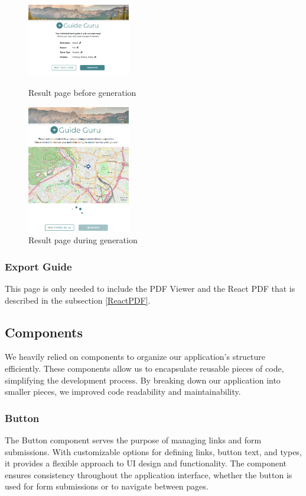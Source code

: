 \documentclass[english,notitlepage,smartquotes]{hgbreport}
\begin{document}
\begin{figure}[H]
	\centering
	\includegraphics[width=0.4\textwidth]{ResultPage.png}
	\caption{Result page before generation}
	\includegraphics[width=0.4\textwidth]{ResultPageLoading.png}
	\caption{Result page during generation}
\end{figure}

\subsubsection{Export Guide}

This page is only needed to include the PDF Viewer and the React PDF that is described in the subsection \ref{ReactPDF}. 

\subsection{Components}
We heavily relied on components to organize our application's structure efficiently. These components allow us to encapsulate reusable pieces of code, simplifying the development process. By breaking down our application into smaller pieces, we improved code readability and maintainability.

\subsubsection{Button}
The Button component serves the purpose of managing links and form submissions. With customizable options for defining links, button text, and types, it provides a flexible approach to UI design and functionality. The component ensures consistency throughout the application interface, whether the button is used for form submissions or to  navigate between pages.
\end{document}
